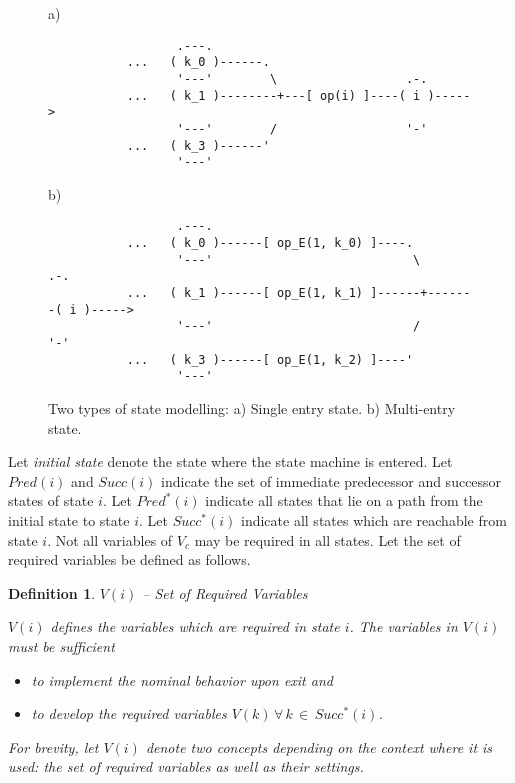 \documentclass[12pt,a4paper]{scrartcl}
\newtheorem{definition}{Definition}
\begin{document}
\begin{figure}[htbp] \leavevmode \label{fig:se-vs-me}
a)

\begin{verbatim}
                  .---.  
           ...   ( k_0 )------.
                  '---'        \                  .-.
           ...   ( k_1 )--------+---[ op(i) ]----( i )----->   
                  '---'        /                  '-'
           ...   ( k_3 )------'       
                  '---'
\end{verbatim}
     
b)
     
\begin{verbatim}
                  .---.
           ...   ( k_0 )------[ op_E(1, k_0) ]----.
                  '---'                            \         .-.
           ...   ( k_1 )------[ op_E(1, k_1) ]------+-------( i )----->  
                  '---'                            /         '-'
           ...   ( k_3 )------[ op_E(1, k_2) ]----'       
                  '---'
\end{verbatim}
\caption{Two types of state modelling: a) Single entry state. 
b) Multi-entry state.}
\end{figure}

Let \textit{initial state} denote the state where the state machine is entered.
Let $Pred(i)$ and $Succ(i)$ indicate the set of immediate predecessor and
successor states of state $i$. Let $Pred^*(i)$ indicate all states that lie on
a path from the initial state to state $i$.  Let $Succ^*(i)$ indicate all
states which are reachable from state $i$. Not all variables of $V_c$ may be
required in all states. Let the set of required variables be defined as follows.

\begin{definition}
$V(i)$ -- Set of Required Variables

$V(i)$ defines the variables which are required in state $i$.
The variables in $V(i)$ must be sufficient

\begin{itemize}
\item to implement the nominal behavior upon exit and
\item to develop the required variables $V(k)\,\forall\,k\,\in\,Succ^*(i)$. 
\end{itemize}

For brevity, let $V(i)$ denote two concepts depending on the context where it
is used: the set of required variables as well as their settings.

\end{definition}
\end{document}

